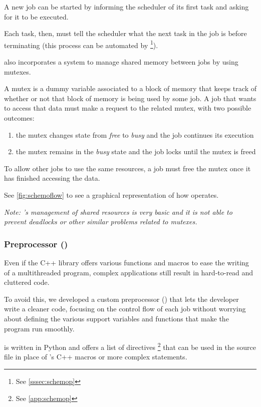   A new job can be started by informing the scheduler of its first
  task and asking for it to be executed.

  Each task, then, must tell the scheduler what the next task in the
  job is before terminating (this process can be automated by
  \footnote{See \autoref{sssec:schemop}}).

  \ScheMo{} also incorporates a system to manage shared memory between
  jobs by using mutexes.

  \beforelist* A mutex is a dummy variable associated to a block of memory that
  keeps track of whether or not that block of memory is being used by
  some job. A job that wants to access that data must make a request
  to the related mutex, with two possible outcomes:
  \begin{enumerate}
    \item the mutex changes state from \textit{free} to
      \textit{busy} and the job continues its execution
    \item the mutex remains in the \textit{busy} state and the job
      locks until the mutex is freed
  \end{enumerate}
  \afterlist*
  To allow other jobs to use the same resources, a job must free the
  mutex once it has finished accessing the data.

  See \autoref{fig:schemoflow} to see a graphical representation
  of how \ScheMo{} operates.

  \textit{Note: \ScheMo{}'s management of shared resources is very
  basic and it is not able to prevent deadlocks or other similar
  problems related to mutexes.}
 
\subsubsection{\ScheMo{} Preprocessor ()}
\label{sssec:schemop}
  Even if the C++ library offers various functions and macros to
  ease the writing of a multithreaded program, complex applications
  still result in hard-to-read and cluttered code.

  To avoid this, we developed a custom preprocessor
  () that lets the developer write a cleaner code,
  focusing on the control flow of each job without worrying about
  defining the various support variables and functions that make the
  program run smoothly.

   is written in Python and offers a list of directives%
  \footnote{See \autoref{app:schemop}} that can be used in the
  source file in place of \ScheMo{}'s C++ macros or more complex statements.
  
